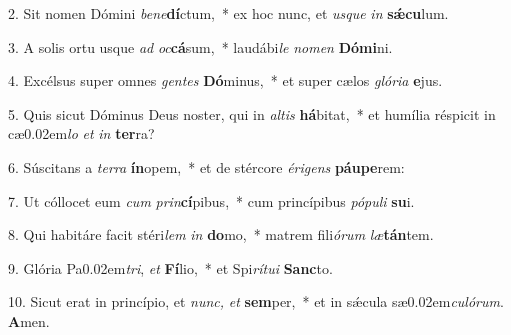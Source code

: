 \item 2. Sit nomen Dómini \textit{be}\textit{ne}\textbf{dí}ctum,~* ex hoc nunc, et \textit{usque} \textit{in} \textbf{sǽcu}lum.
\item 3. A solis ortu usque \textit{ad} \textit{oc}\textbf{cá}sum,~* laudábi\textit{le} \textit{nomen} \textbf{Dómi}ni.
\item 4. Excélsus super omnes \textit{gentes} \textbf{Dó}minus,~* et super cælos \textit{glória} \textbf{e}jus.
\item 5. Quis sicut Dóminus Deus noster, qui in \textit{altis} \textbf{há}bitat,~* et humília réspicit in cæ\kern0.02em\textit{lo} \textit{et} \textit{in} \textbf{ter}ra?
\item 6. Súscitans a \textit{terra} \textbf{ín}opem,~* et de stércore \textit{érigens} \textbf{páu}\textbf{pe}rem:
\item 7. Ut cóllocet eum \textit{cum} \textit{prin}\textbf{cí}pibus,~* cum princípibus \textit{pópuli} \textbf{su}i.
\item 8. Qui habitáre facit stéri\textit{lem} \textit{in} \textbf{do}mo,~* matrem fili\textit{órum} \textit{læ}\textbf{tán}tem.
\item 9. Glória Pa\kern0.02em\textit{tri}, \textit{et} \textbf{Fí}lio,~* et Spi\textit{rítui} \textbf{Sanc}to.
\item 10. Sicut erat in princípio, et \textit{nunc,} \textit{et} \textbf{sem}per,~* et in sǽcula sæ\kern0.02em\textit{culórum}. \textbf{A}men.